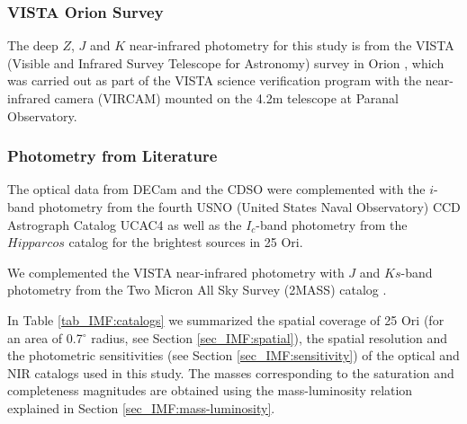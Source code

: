 \documentclass[12pt]{article}
\newcounter{subsubsubsection}[subsubsection]
\begin{document}
\subsubsection{VISTA Orion Survey}
\label{sec_IMF:VISTA}
The deep $Z$, $J$ and $K$ near-infrared photometry for this study is from the \ac{VISTA} (Visible and Infrared Survey Telescope for Astronomy) survey in Orion \citep{Petr-Gotzens2011}, which was carried out as part of the VISTA science verification program \citep{Arnaboldi2010} with the near-infrared camera (VIRCAM) mounted on the 4.2m telescope at Paranal Observatory.

\subsubsection{Photometry from Literature}
\label{sec:catalogs}
The optical data from DECam and the CDSO were complemented with the $i$-band photometry from the fourth \ac{USNO} (United States Naval Observatory) CCD Astrograph Catalog \ac{UCAC4} \citep{Zacharias2013} as well as the $I_c$-band photometry from the $Hipparcos$ catalog \citep{Perryman1997} for the brightest sources in 25 Ori.

We complemented the VISTA near-infrared photometry with $J$ and $Ks$-band photometry from the Two Micron All Sky Survey (\ac{2MASS}) catalog \citep{Skrutskie2006}.

In Table \ref{tab_IMF:catalogs} we summarized the spatial coverage of 25 Ori (for an area of 0.7$^\circ$ radius, see Section \ref{sec_IMF:spatial}), the spatial resolution and the photometric sensitivities (see Section \ref{sec_IMF:sensitivity}) of the optical and NIR catalogs used in this study. The masses corresponding to the saturation and completeness magnitudes are obtained using the mass-luminosity relation explained in Section \ref{sec_IMF:mass-luminosity}.
\end{document}
